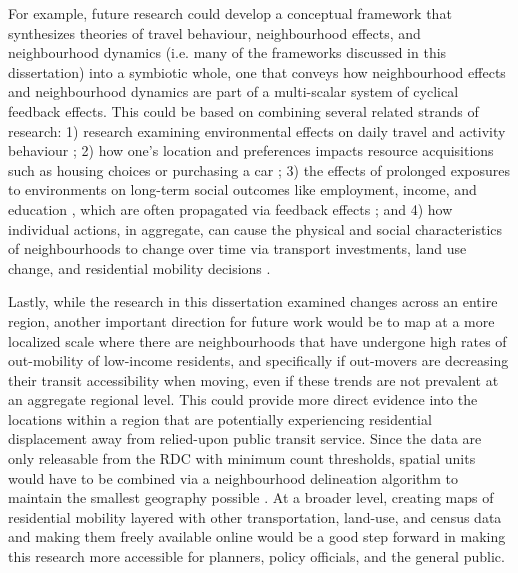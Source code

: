For example, future research could develop a conceptual framework that synthesizes theories of travel behaviour, neighbourhood effects, and neighbourhood dynamics (i.e. many of the frameworks discussed in this dissertation) into a symbiotic whole, one that conveys how neighbourhood effects and neighbourhood dynamics are part of a multi-scalar system of cyclical feedback effects. This could be based on combining several related strands of research: 1) research examining environmental effects on daily travel and activity behaviour \cite{hanson_determinants_1982,ewing_travel_2010}; 2) how one's location and preferences impacts resource acquisitions such as housing choices or purchasing a car \cite{lee_neighborhood_1994,klein_millennials_2017}; 3) the effects of prolonged exposures to environments on long-term social outcomes like employment, income, and education \cite{sampson_assessing_2002,chetty_effects_2016}, which are often propagated via feedback effects \cite{wilson_truly_2012,lucas_transport_2012}; and 4) how individual actions, in aggregate, can cause the physical and social characteristics of neighbourhoods to change over time via transport investments, land use change, and residential mobility decisions \cite{wegener_land-use_2004,wilson_truly_2012,van_ham_understanding_2013}. 

%

Lastly, while the research in this dissertation examined changes across an entire region, another important direction for future work would be to map at a more localized scale where there are neighbourhoods that have undergone high rates of out-mobility of low-income residents, and specifically if out-movers are decreasing their transit accessibility when moving, even if these trends are not prevalent at an aggregate regional level. This could provide more direct evidence into the locations within a region that are potentially experiencing residential displacement away from relied-upon public transit service. Since the data are only releasable from the RDC with minimum count thresholds, spatial units would have to be combined via a neighbourhood delineation algorithm to maintain the smallest geography possible \cite{folch_identifying_2014, wei_efficient_2021}. At a broader level, creating maps of residential mobility layered with other transportation, land-use, and census data and making them freely available online would be a good step forward in making this research more accessible for planners, policy officials, and the general public.

